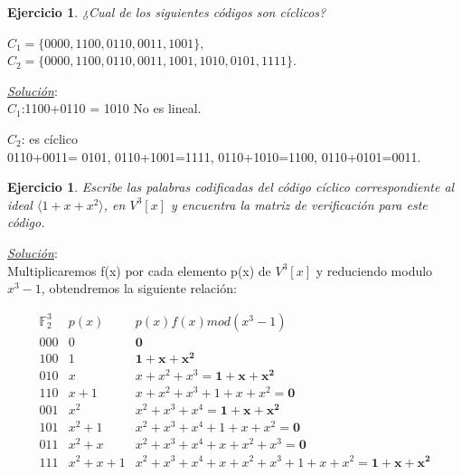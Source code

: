 \documentclass{beamer}
\theoremstyle{plain}
\theoremstyle{example}
\newtheorem{ejercicio} [Ejercicio]{Ejercicio}
\theoremstyle{example}
\begin{document}
\begin{frame}  \small \begin{ejercicio} 

¿Cual de los siguientes códigos son cíclicos?

$C_1 = \{0000, 1100, 0110, 0011, 1001\},$\\
$C_2 = \{0000, 1100, 0110, 0011, 1001, 1010, 0101, 1111\}.$\\

\end{ejercicio} %
\textit{\underline{Solución}}:\\ 
 \vspace*{5pt}
$C_1$:1100+0110 = 1010 No es lineal.\\
\vspace{0.3cm}

$C_2$: es cíclico \\
\vspace{0.3cm}
0110+0011= 0101,  0110+1001=1111, 0110+1010=1100, 0110+0101=0011.


\end{frame} 

\begin{frame}  \small \begin{ejercicio} 

Escribe las palabras codificadas del código cíclico correspondiente al ideal $\langle 1+x+x^2\rangle$, en $V^3[x]$ y encuentra la matriz de verificación para este código.

\end{ejercicio} 

 \textit{\underline{Solución}}:\\ 
 \vspace*{5pt}
Multiplicaremos f(x) por cada elemento p(x) de $V^3[x]$ y reduciendo modulo $x^3 - 1$, obtendremos la siguiente relación:
\begin{center}

\[
    \begin{array}{ccl}
					 \mathbb{F}_2^3 & p(x) &  p(x)f(x) mod (x^3-1)  \\ \hline
					 000 &  0 &     \mathbf{0}\\ 
					 100 &  1 &     \mathbf{1+x+x^2}\\ 
					 010 &  x &     x+x^2+x^3=\mathbf{1+x+x^2}\\ 
					 110 &  x+1 &   x+x^2+x^3+1+x+x^2 =\mathbf {0}  \\ 
					 001 &  x^2 &    x^2  +x^3+ x^4 = \mathbf {1+x+x^2} \\ 
					 101 &  x^2+1 & x^2+x^3+x^4+1+x+x^2 =\mathbf {0}   \\
					 011 &  x^2+x &    x^2+x^3+x^4+x+x^2+x^3=\mathbf {0} \\  
					 111 &  x^2+x+1 &   x^2+x^3+x^4+x+x^2+x^3+1+x+x^2=\mathbf {1+x+x^2}  

     \end{array}	    		
\]
\end{center}

\end{frame} 
\end{document}
